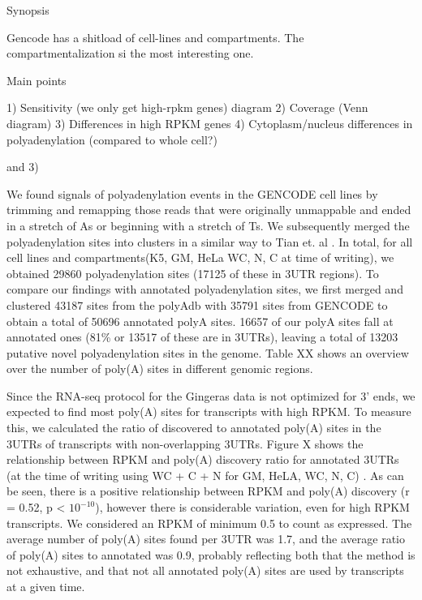 \documentclass[a4paper]{article}
\begin{document}
 
Synopsis

Gencode has a shitload of cell-lines and compartments. The compartmentalization
si the most interesting one.

Main points

1) Sensitivity (we only get high-rpkm genes) diagram
2) Coverage (Venn diagram)
3) Differences in high RPKM genes
4) Cytoplasm/nucleus differences in polyadenylation (compared to whole cell?)

and 3) %

We found signals of polyadenylation events in the GENCODE cell lines by
trimming and remapping those reads that were originally unmappable and ended in
a stretch of As or beginning with a stretch of Ts. We subsequently merged the
polyadenylation sites into clusters in a similar way to Tian et. al
\cite{tian_large-scale_2005}. In total, for all cell lines and compartments(K5,
GM, HeLa WC, N, C at time of writing), we obtained 29860 polyadenylation sites
(17125 of these in 3UTR regions). To compare our findings with annotated
polyadenylation sites, we first merged and clustered 43187 sites from the
polyAdb with 35791 sites from GENCODE to obtain a total of 50696 annotated
polyA sites. 16657 of our polyA sites fall at annotated ones (81\% or 13517 of
these are in 3UTRs), leaving a total of 13203 putative novel polyadenylation
sites in the genome. Table XX shows an overview over the number of poly(A)
sites in different genomic regions.

Since the RNA-seq protocol for the Gingeras data is not optimized for 3' ends,
we expected to find most poly(A) sites for transcripts with high RPKM. To
measure this, we calculated the ratio of discovered to annotated poly(A) sites
in the 3UTRs of transcripts with non-overlapping 3UTRs. Figure X shows the
relationship between RPKM and poly(A) discovery ratio for annotated 3UTRs (at
the time of writing using WC + C + N for GM, HeLA, WC, N, C) . As can be seen,
there is a positive relationship between RPKM and poly(A) discovery (r = 0.52,
p < $10^{-10}$), however there is considerable variation, even for high RPKM
transcripts. We considered an RPKM of minimum 0.5 to count as expressed. The
average number of poly(A) sites found per 3UTR was 1.7, and the average ratio
of poly(A) sites to annotated was 0.9, probably reflecting both that the method
is not exhaustive, and that not all annotated poly(A) sites are used by
transcripts at a given time.
\end{document}

